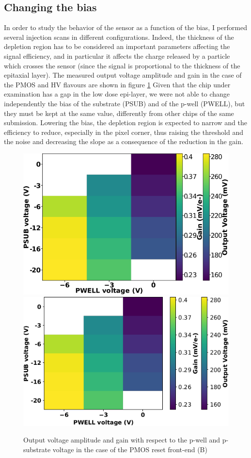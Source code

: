     \subsection{Changing the bias}\label{chap:characterization_section:bias}
        In order to study the behavior of the sensor as a function of the bias, I performed several injection scans in different configurations. 
        Indeed, the thickness of the depletion region has to be considered an important parameters affecting the signal efficiency, and in particular it affects the charge released by a particle which crosses the sensor (since the signal is proportional to the thickness of the epitaxial layer).
        The measured output voltage amplitude and gain in the case of the PMOS and HV flavours are shown in figure \ref{fig:gain_vs_bias}
        Given that the chip under examination has a gap in the low dose epi-layer, we were not able to change independently the bias of the substrate (PSUB) and of the p-well (PWELL), but they must be kept at the same value, differently from other chips of the same submission.
        Lowering the bias, the depletion region is expected to narrow and the efficiency to reduce, especially in the pixel corner, thus raising the threshold and the noise and decreasing the slope as a consequence of the reduction in the gain.
        \begin{figure}[h!]
            \centering
            \includegraphics[width=.35\linewidth]{figures/Monopix1/PMOS_gain_bias.png}
            \includegraphics[width=.39\linewidth]{figures/Monopix1/HV_gain_bias.png}            
            \caption{Output voltage amplitude and gain with respect to the p-well and p-substrate voltage in the case of the PMOS reset front-end (B)}
            \label{fig:gain_vs_bias}
        \end{figure}  

